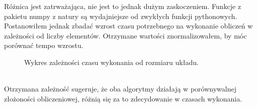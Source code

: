 \documentclass{article}
\begin{document}
        Różnica jest zatrważająca, nie jest to jednak dużym zaskoczeniem. Funkcje z pakietu numpy z natury są wydajniejsze od zwykłych funkcji pythonowych. Postanowiłem jednak zbadać wzrost czasu potrzebnego na wykonanie obliczeń w zależności od liczby elementów. Otrzymane wartości znormalizowałem, by móc porównać tempo wzrostu.\\
        \begin{figure}[h!]
            \centering
            \caption{Wykres zależności czasu wykonania od rozmiaru układu.}
        \end{figure}\\
        Otrzymana zależność sugeruje, że oba algorytmy działają w porównywalnej złożoności obliczeniowej, różnią się za to zdecydowanie w czasach wykonania.\\
        
\end{document}
